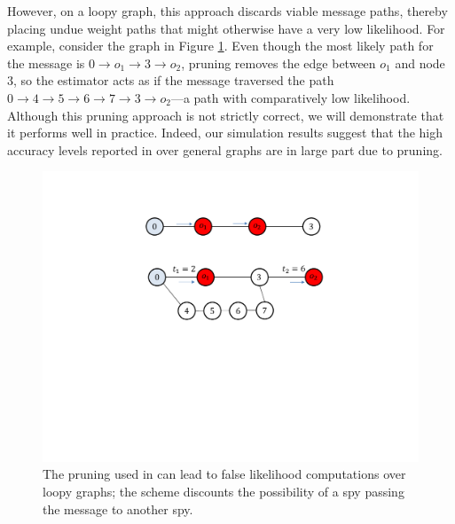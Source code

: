 However, on a loopy graph, this approach discards viable message paths, thereby placing undue weight paths that might otherwise have a very low likelihood. For example, consider the graph in Figure \ref{fig:pruning2}. Even though the most likely path for the message is $0\rightarrow o_1\rightarrow 3 \rightarrow o_2$, pruning removes the edge between $o_1$ and node $3$, so the estimator acts as if the message traversed the path $0\rightarrow 4\rightarrow 5 \rightarrow 6 \rightarrow 7 \rightarrow 3 \rightarrow o_2$---a path with comparatively low likelihood. Although this pruning approach is not strictly correct, we will demonstrate that it performs well in practice. Indeed, our simulation results suggest that the high accuracy levels reported in \cite{pinto} over general graphs are in large part due to pruning.
\begin{figure}[h]
\centering
\includegraphics{figures/pruning2}
\caption{The pruning used in \cite{pinto} can lead to false likelihood computations over loopy graphs; the scheme discounts the possibility of a spy passing the message to another spy.
}
\label{fig:pruning2}
\end{figure}

